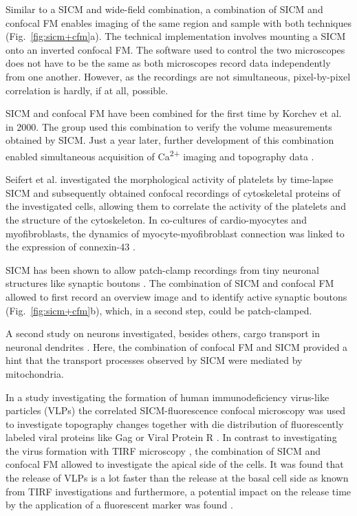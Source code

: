 Similar to a SICM and wide-field combination, a combination of SICM and
confocal FM enables imaging of the same region and sample with both techniques
(Fig.~\ref{fig:sicm+cfm}a). The technical implementation involves mounting a
SICM onto an inverted confocal FM. The software used to control the two
microscopes does not have to be the same as both microscopes record data
independently from one another. However, as the recordings are not
simultaneous, pixel-by-pixel correlation is hardly, if at all, possible.

SICM and confocal FM have been combined for the first time by Korchev et al.
\cite{Korchev2000} in 2000. The group used this combination to verify the
volume measurements obtained by SICM. Just a year later, further development
of this combination enabled simultaneous acquisition of Ca\textsuperscript{2+}
imaging and topography data \cite{Shevchuk2001}.

Seifert et al. \cite{Seifert2017} investigated the morphological activity of
platelets by time-lapse SICM and subsequently obtained confocal recordings of
cytoskeletal proteins of the investigated cells, allowing them to correlate
the activity of the platelets and the structure of the cytoskeleton.
In co-cultures of cardio-myocytes and myofibroblasts, the dynamics of
myocyte-myofibroblast connection was linked to the expression of connexin-43
\cite{Schultz2019}.


SICM has been shown to allow patch-clamp recordings from tiny neuronal
structures like synaptic boutons \cite{Novak2013}. The combination of SICM and
confocal FM allowed to first record an overview image and to identify active
synaptic boutons (Fig.~\ref{fig:sicm+cfm}b), which, in a second step, could be
patch-clamped.

A second study on neurons investigated, besides others, cargo transport in
neuronal dendrites \cite{Takahashi2019}. Here, the combination of
confocal FM and SICM provided a hint that the transport processes observed by
SICM were mediated by mitochondria.


In a study investigating the formation of human immunodeficiency virus-like
particles (VLPs) the correlated SICM-fluorescence confocal microscopy was used
to investigate topography changes together with die distribution of
fluorescently labeled viral proteins like Gag or Viral Protein R
\cite{Bednarska2020}. In contrast to investigating the virus formation with
TIRF microscopy \cite{Jouvenet2008}, the combination of SICM and confocal FM
allowed to investigate the apical side of the cells. It was found that the
release of VLPs is a lot faster than the release at the basal cell side as
known from TIRF investigations and furthermore, a potential impact on the
release time by the application of a fluorescent marker was found
\cite{Bednarska2020}.


